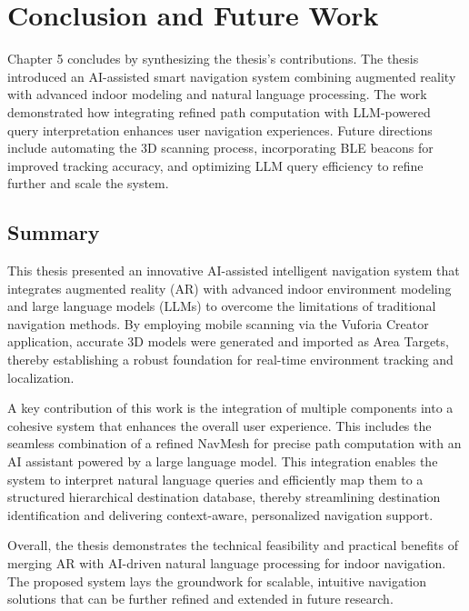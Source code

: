 \chapter{Conclusion and Future Work}
\label{sec:Conclusion and Future Work}
\begin{ChapAbstract}

Chapter 5 concludes by synthesizing the thesis's contributions. The thesis introduced an AI-assisted smart navigation system combining augmented reality with advanced indoor modeling and natural language processing. The work demonstrated how integrating refined path computation with LLM-powered query interpretation enhances user navigation experiences. Future directions include automating the 3D scanning process, incorporating BLE beacons for improved tracking accuracy, and optimizing LLM query efficiency to refine further and scale the system.

\end{ChapAbstract}

\section{Summary}
This thesis presented an innovative AI-assisted intelligent navigation system that integrates augmented reality (AR) with advanced indoor environment modeling and large language models (LLMs) to overcome the limitations of traditional navigation methods. By employing mobile scanning via the Vuforia Creator application, accurate 3D models were generated and imported as Area Targets, thereby establishing a robust foundation for real-time environment tracking and localization.

A key contribution of this work is the integration of multiple components into a cohesive system that enhances the overall user experience. This includes the seamless combination of a refined NavMesh for precise path computation with an AI assistant powered by a large language model. This integration enables the system to interpret natural language queries and efficiently map them to a structured hierarchical destination database, thereby streamlining destination identification and delivering context-aware, personalized navigation support.

Overall, the thesis demonstrates the technical feasibility and practical benefits of merging AR with AI-driven natural language processing for indoor navigation. The proposed system lays the groundwork for scalable, intuitive navigation solutions that can be further refined and extended in future research.

